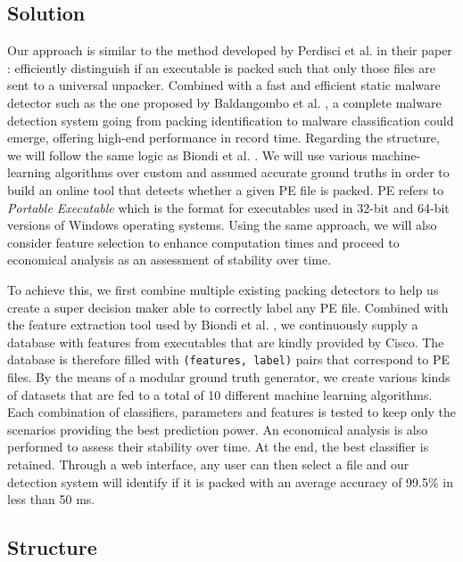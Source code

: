 \subsection*{Solution}

Our approach is similar to the method developed by Perdisci et al. \cite{perdisci_classification_2008} in their paper : efficiently distinguish if an executable is packed such that only those files are sent to a universal unpacker. Combined with a fast and efficient static malware detector such as the one proposed by Baldangombo et al. \cite{baldangombo_static_2013}, a complete malware detection system going from packing identification to malware classification could emerge, offering high-end performance in record time. Regarding the structure, we will follow the same logic as Biondi et al. \cite{biondi_effective_2019}. We will use various machine-learning algorithms over custom and assumed accurate ground truths in order to build an online tool that detects whether a given PE file is packed. PE refers to \textit{Portable Executable} which is the format for executables used in 32-bit and 64-bit versions of Windows operating systems. Using the same approach, we will also consider feature selection to enhance computation times and proceed to economical analysis as an assessment of stability over time.

To achieve this, we first combine multiple existing packing detectors to help us create a super decision maker able to correctly label any PE file. Combined with the feature extraction tool used by Biondi et al. \cite{biondi_effective_2019}, we continuously supply a database with features from executables that are kindly provided by Cisco. The database is therefore filled with \texttt{(features, label)} pairs that correspond to PE files. By the means of a modular ground truth generator, we create various kinds of datasets that are fed to a total of 10 different machine learning algorithms. Each combination of classifiers, parameters and features is tested to keep only the scenarios providing the best prediction power. An economical analysis is also performed to assess their stability over time. At the end, the best classifier is retained. Through a web interface, any user can then select a file and our detection system will identify if it is packed with an average accuracy of 99.5\% in less than 50 ms.

\subsection*{Structure}

